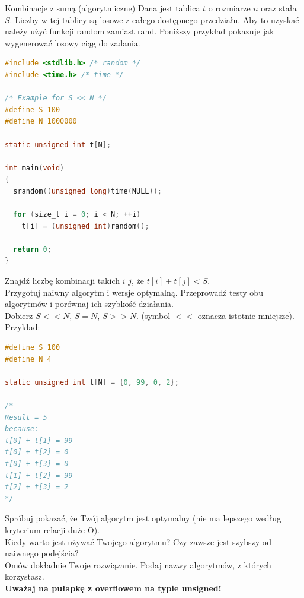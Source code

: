 \clearpage

\begin{exercise}{Kombinacje z sumą (algorytmiczne)}{}
Dana jest tablica $t$ o rozmiarze $n$ oraz stała $S$. Liczby w tej tablicy są losowe z całego dostępnego przedziału. Aby to uzyskać należy użyć funkcji random zamiast rand. Poniższy przykład pokazuje jak wygenerować losowy ciąg do zadania.

\begin{lstlisting}[language=C,style=C99]
#include <stdlib.h> /* random */
#include <time.h> /* time */

/* Example for S << N */
#define S 100
#define N 1000000

static unsigned int t[N];

int main(void)
{
  srandom((unsigned long)time(NULL));
  
  for (size_t i = 0; i < N; ++i)
    t[i] = (unsigned int)random();
    
  return 0;
}

\end{lstlisting}

Znajdź liczbę kombinacji takich $i$ $j$, że $t[i] + t[j] < S$. \\
Przygotuj naiwny algorytm i wersje optymalną. Przeprowadź testy obu algorytmów i porównaj ich szybkość działania. \\
Dobierz $S << N$, $S = N$, $S >> N$. (symbol $<<$ oznacza istotnie mniejsze). \\

Przykład:
\begin{lstlisting}[language=C,style=C99]
#define S 100
#define N 4

static unsigned int t[N] = {0, 99, 0, 2};

/* 
Result = 5
because:
t[0] + t[1] = 99
t[0] + t[2] = 0
t[0] + t[3] = 0
t[1] + t[2] = 99
t[2] + t[3] = 2
*/
\end{lstlisting}

Spróbuj pokazać, że Twój algorytm jest optymalny (nie ma lepszego według kryterium relacji duże O). \\
Kiedy warto jest używać Twojego algorytmu? Czy zawsze jest szybszy od naiwnego podejścia? \\


Omów dokładnie Twoje rozwiązanie. Podaj nazwy algorytmów, z których korzystasz. \\

\textbf{Uważaj na pułapkę z overflowem na typie unsigned!}
\end{exercise}

